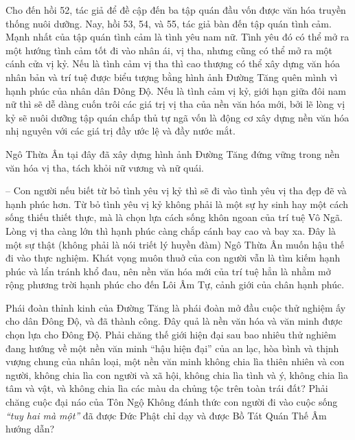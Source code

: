 Cho đến hồi 52, tác giả để đề cập đến ba tập quán đầu vốn được văn hóa truyền thống nuôi dưỡng. Nay, hồi 53, 54, và 55, tác giả bàn đến tập quán tình cảm. Mạnh nhất của tập quán tình cảm là tình yêu nam nữ. Tình yêu đó có thể mở ra một hướng tình cảm tốt đi vào nhân ái, vị tha, nhưng cũng có thể mở ra một cánh cửa vị kỷ. Nếu là tình cảm vị tha thì cao thượng có thể xây dựng văn hóa nhân bản và trí tuệ được biểu tượng bằng hình ảnh Đường Tăng quên mình vì hạnh phúc của nhân dân Đông Độ. Nếu là tình cảm vị kỷ, giới hạn giữa đôi nam nữ thì sẽ dễ dàng cuốn trôi các giá trị vị tha của nền văn hóa mới, bởi lẽ lòng vị kỷ sẽ nuôi dưỡng tập quán chấp thủ tự ngã vốn là động cơ xây dựng nền văn hóa nhị nguyên với các giá trị đầy ước lệ và đầy nước mắt.

Ngô Thừa Ân tại đây đã xây dựng hình ảnh Đường Tăng đứng vững trong nền văn hóa vị tha, tách khỏi nữ vương và nữ quái.

-- Con người nếu biết từ bỏ tình yêu vị kỷ thì sẽ đi vào tình yêu vị tha đẹp đẽ và hạnh phúc hơn. Từ bỏ tình yêu vị kỷ không phải là một sự hy sinh hay một cách sống thiếu thiết thực, mà là chọn lựa cách sống khôn ngoan của trí tuệ Vô Ngã. Lòng vị tha càng lớn thì hạnh phúc càng chắp cánh bay cao và bay xa. Đây là một sự thật (không phải là nói triết lý huyền đàm) Ngô Thừa Ân muốn hậu thế đi vào thực nghiệm. Khát vọng muôn thuở của con người vẫn là tìm kiếm hạnh phúc và lẩn tránh khổ đau, nên nền văn hóa mới của trí tuệ hẳn là nhằm mở rộng phương trời hạnh phúc cho đến Lôi Âm Tự, cảnh giới của chân hạnh phúc.

Phái đoàn thỉnh kinh của Đường Tăng là phái đoàn mở đầu cuộc thử nghiệm ấy cho dân Đông Độ, và đã thành công. Đây quả là nền văn hóa và văn minh được chọn lựa cho Đông Độ. Phải chăng thế giới hiện đại sau bao nhiêu thử nghiêm đang hướng về một nền văn minh ``hậu hiện đại'' của an lạc, hòa bình và thịnh vượng chung của nhân loại, một nền văn minh không chia lìa thiên nhiên và con người, không chia lìa con người và xã hội, không chia lìa tình và ý, không chia lìa tâm và vật, và không chia lìa các màu da chủng tộc trên toàn trái đất? Phải chăng cuộc đại náo của Tôn Ngộ Không đánh thức con người đi vào cuộc sống \emph{``tuy hai mà một''} đã được Đức Phật chỉ dạy và được Bồ Tát Quán Thế Âm hướng dẫn?
